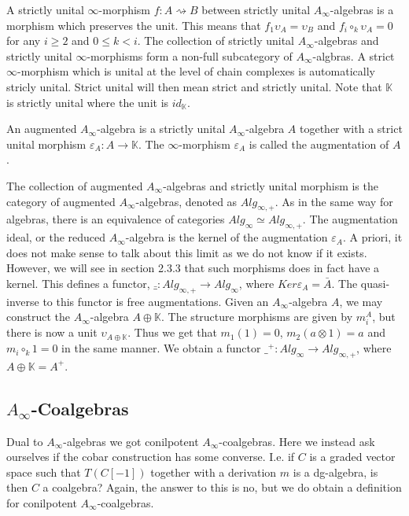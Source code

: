 \documentclass[../thesis.tex]{subfiles}
\begin{document}
        A strictly unital $\infty$-morphism $f: A \rightsquigarrow B$ between strictly unital $A_\infty$-algebras is a morphism which preserves the unit. This means that $f_1\upsilon_A = \upsilon_B$ and $f_i \circ_k \upsilon_A = 0$ for any $i \geq 2$ and $0 \leq k < i$. The collection of strictly unital $A_\infty$-algebras and strictly unital $\infty$-morphisms form a non-full subcategory of $A_\infty$-algbras. A strict $\infty$-morphism which is unital at the level of chain complexes is automatically stricly unital. Strict unital will then mean strict and strictly unital. Note that $\mathbb{K}$ is strictly unital where the unit is $id_\mathbb{K}$.

        \begin{definition}
            An augmented $A_\infty$-algebra is a strictly unital $A_\infty$-algebra $A$ together with a strict unital morphism $\varepsilon_A : A \rightarrow \mathbb{K}$. The $\infty$-morphism $\varepsilon_A$ is called the augmentation of $A$.
        \end{definition}

        The collection of augmented $A_\infty$-algebras and strictly unital morphism is the category of augmented $A_\infty$-algebras, denoted as $Alg_{\infty,+}$. As in the same way for algebras, there is an equivalence of categories $Alg_\infty \simeq Alg_{\infty,+}$. The augmentation ideal, or the reduced $A_\infty$-algebra is the kernel of the augmentation $\varepsilon_A$. A priori, it does not make sense to talk about this limit as we do not know if it exists. However, we will see in section 2.3.3 that such morphisms does in fact have a kernel. This defines a functor, $\bar{\_} : Alg_{\infty ,+} \rightarrow Alg_\infty$, where $Ker\varepsilon_A = \bar{A}$. The quasi-inverse to this functor is free augmentations. Given an $A_\infty$-algebra $A$, we may construct the $A_\infty$-algebra $A\oplus \mathbb{K}$. The structure morphisms are given by $m_i^A$, but there is now a unit $\upsilon_{A\oplus\mathbb{K}}$. Thus we get that $m_1(1) = 0$, $m_2 (a\otimes 1) = a$ and $m_i \circ_k 1 = 0$ in the same manner. We obtain a functor $\_^+ : Alg_\infty \rightarrow Alg_{\infty, +}$, where $A\oplus \mathbb{K} = A^+$.

    \subsection{$A_\infty$-Coalgebras}    
        Dual to $A_\infty$-algebras we got conilpotent $A_\infty$-coalgebras. Here we instead ask ourselves if the cobar construction has some converse. I.e. if $C$ is a graded vector space such that $T(C[-1])$ together with a derivation $m$ is a dg-algebra, is then $C$ a coalgebra? Again, the answer to this is no, but we do obtain a definition for conilpotent $A_\infty$-coalgebras.
\end{document}
